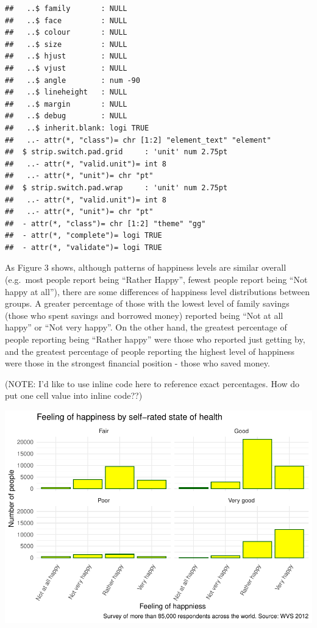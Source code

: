 \documentclass[man,floatsintext]{apa6}
\begin{document}
\begin{verbatim}
##   ..$ family       : NULL
##   ..$ face         : NULL
##   ..$ colour       : NULL
##   ..$ size         : NULL
##   ..$ hjust        : NULL
##   ..$ vjust        : NULL
##   ..$ angle        : num -90
##   ..$ lineheight   : NULL
##   ..$ margin       : NULL
##   ..$ debug        : NULL
##   ..$ inherit.blank: logi TRUE
##   ..- attr(*, "class")= chr [1:2] "element_text" "element"
##  $ strip.switch.pad.grid     : 'unit' num 2.75pt
##   ..- attr(*, "valid.unit")= int 8
##   ..- attr(*, "unit")= chr "pt"
##  $ strip.switch.pad.wrap     : 'unit' num 2.75pt
##   ..- attr(*, "valid.unit")= int 8
##   ..- attr(*, "unit")= chr "pt"
##  - attr(*, "class")= chr [1:2] "theme" "gg"
##  - attr(*, "complete")= logi TRUE
##  - attr(*, "validate")= logi TRUE
\end{verbatim}

As Figure 3 shows, although patterns of happiness levels are similar overall (e.g.~most people report being \enquote{Rather Happy}, fewest people report being \enquote{Not happy at all}), there are some differences of happiness level distributions between groups. A greater percentage of those with the lowest level of family savings (those who spent savings and borrowed money) reported being \enquote{Not at all happy} or \enquote{Not very happy}. On the other hand, the greatest percentage of people reporting being \enquote{Rather happy} were those who reported just getting by, and the greatest percentage of people reporting the highest level of happiness were those in the strongest financial position - those who saved money.

(NOTE: I'd like to use inline code here to reference exact percentages. How do put one cell value into inline code??)

\includegraphics{610_final_files/figure-latex/trust and health-1.pdf}
\end{document}
